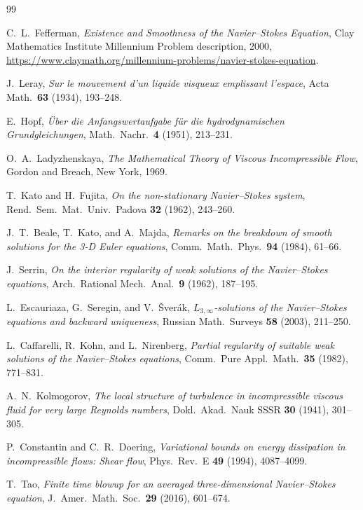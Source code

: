 \documentclass[12pt,a4paper]{article}
\theoremstyle{remark}
\begin{document}
\begin{thebibliography}{99}

C.~L.~Fefferman,
\textit{Existence and Smoothness of the Navier--Stokes Equation},
Clay Mathematics Institute Millennium Problem description, 2000,
\url{https://www.claymath.org/millennium-problems/navier-stokes-equation}.

J.~Leray,
\textit{Sur le mouvement d'un liquide visqueux emplissant l'espace},
Acta Math.\ \textbf{63} (1934), 193--248.

E.~Hopf,
\textit{Über die Anfangswertaufgabe für die hydrodynamischen Grundgleichungen},
Math.\ Nachr.\ \textbf{4} (1951), 213--231.

O.~A.~Ladyzhenskaya,
\textit{The Mathematical Theory of Viscous Incompressible Flow},
Gordon and Breach, New York, 1969.

T.~Kato and H.~Fujita,
\textit{On the non-stationary Navier--Stokes system},
Rend.\ Sem.\ Mat.\ Univ.\ Padova \textbf{32} (1962), 243--260.

J.~T.~Beale, T.~Kato, and A.~Majda,
\textit{Remarks on the breakdown of smooth solutions for the 3-D Euler equations},
Comm.\ Math.\ Phys.\ \textbf{94} (1984), 61--66.

J.~Serrin,
\textit{On the interior regularity of weak solutions of the Navier--Stokes equations},
Arch.\ Rational Mech.\ Anal.\ \textbf{9} (1962), 187--195.

L.~Escauriaza, G.~Seregin, and V.~Šverák,
\textit{$L_{3,\infty}$-solutions of the Navier--Stokes equations and backward uniqueness},
Russian Math.\ Surveys \textbf{58} (2003), 211--250.

L.~Caffarelli, R.~Kohn, and L.~Nirenberg,
\textit{Partial regularity of suitable weak solutions of the Navier--Stokes equations},
Comm.\ Pure Appl.\ Math.\ \textbf{35} (1982), 771--831.

A.~N.~Kolmogorov,
\textit{The local structure of turbulence in incompressible viscous fluid for very large Reynolds numbers},
Dokl.\ Akad.\ Nauk SSSR \textbf{30} (1941), 301--305.

P.~Constantin and C.~R.~Doering,
\textit{Variational bounds on energy dissipation in incompressible flows: Shear flow},
Phys.\ Rev.\ E \textbf{49} (1994), 4087--4099.

T.~Tao,
\textit{Finite time blowup for an averaged three-dimensional Navier--Stokes equation},
J.\ Amer.\ Math.\ Soc.\ \textbf{29} (2016), 601--674.


\end{thebibliography}
\end{document}
